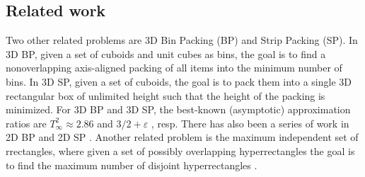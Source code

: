 \documentclass[10pt,a4paper]{amsart}
\newcommand{\ari}[1]{#1}
\newcommand{\eps}{\varepsilon}
\newcommand{\tdk}{\textsc{3DK}}
\theoremstyle{definition}
\begin{document}
\subsection{Related work}
Two other related problems are 3D Bin Packing (BP) and Strip Packing (SP). 
In 3D BP, given a set of cuboids and unit cubes as bins, the goal is to find a nonoverlapping axis-aligned packing of all items into the minimum number of bins.
In 3D SP,  given a set of  cuboids, the goal is to pack them into a single 3D rectangular box of unlimited height such that the height of the packing is minimized.
For 3D BP and 3D SP, the best-known (asymptotic) approximation ratios are $T_\infty^{2}\approx 2.86$ \cite{caprara2008packing} and  $3/2+\eps$ \cite{3d-strip-packing}, resp.
There has also been a series of work in 2D BP \cite{BansalCJPS09, bansal2014improved, jansen-pradel-bin-packing, Khan16c} and 
2D SP \cite{harren20145, KenyonR00}.
Another related problem is the maximum independent set of rrectangles, where given a set of possibly overlapping hyperrectangles the goal is to find the maximum number of disjoint hyperrectangles
\cite{AHW19, misr-arxiv, Mitchell21, GalvezKMMPW22, GargK024}.
\end{document}
